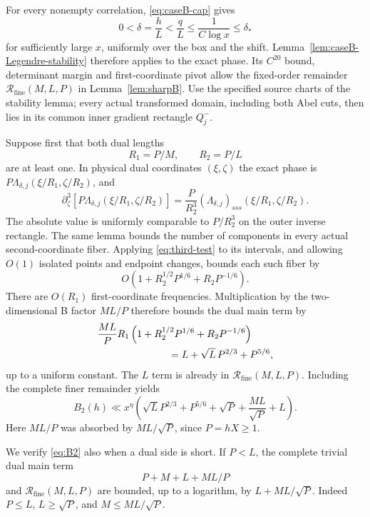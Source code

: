 \documentclass[11pt,a4paper]{article}
\numberwithin{equation}{section}
\theoremstyle{remark}
\newcommand{\Rfine}{\mathcal R_{\mathrm{fine}}}
\begin{document}
For every nonempty correlation, \eqref{eq:caseB-cap} gives
\[
 0<\delta=\frac hL<\frac qL\le\frac1{C\log x}\le\delta_*
\]
for sufficiently large $x$, uniformly over the box and the shift.
Lemma~\ref{lem:caseB-Legendre-stability} therefore applies to the exact
phase. Its $C^{20}$ bound, determinant margin and first-coordinate pivot
allow the fixed-order remainder $\Rfine(M,L,P)$ in
Lemma~\ref{lem:sharpB}. Use the specified source charts of the stability
lemma; every actual transformed domain, including both Abel cuts, then
lies in its common inner gradient rectangle $Q_j^-$.

Suppose first that both dual lengths
\[
 R_1=P/M,\qquad R_2=P/L
\]
are at least one. In physical dual coordinates $(\xi,\zeta)$ the exact
phase is $P\Lambda_{\delta,j}(\xi/R_1,\zeta/R_2)$, and
\begin{equation}\label{eq:caseB-physical-third}
 \partial_\zeta^3\left[P\Lambda_{\delta,j}
               (\xi/R_1,\zeta/R_2)\right]
 =\frac P{R_2^3}(\Lambda_{\delta,j})_{sss}
               (\xi/R_1,\zeta/R_2).
\end{equation}
The absolute value is uniformly comparable to $P/R_2^3$ on the outer
inverse rectangle. The same lemma bounds the number of components in
every actual second-coordinate fiber. Applying \eqref{eq:third-test}
to its intervals, and allowing $O(1)$ isolated points and endpoint
changes, bounds each such fiber by
\[
 O\left(1+R_2^{1/2}P^{1/6}+R_2P^{-1/6}\right).
\]
There are $O(R_1)$ first-coordinate frequencies. Multiplication by the
two-dimensional B factor $ML/P$ therefore bounds the dual main term by
\begin{align*}
 &\frac{ML}{P}R_1
       \left(1+R_2^{1/2}P^{1/6}+R_2P^{-1/6}\right)\\
 &\hspace{25mm}=L+\sqrt L\,P^{2/3}+P^{5/6},
\end{align*}
up to a uniform constant. The $L$ term is already in $\Rfine(M,L,P)$.
Including the complete finer remainder yields
\begin{equation}\label{eq:B2}
 B_2(h)\ll x^\eta\left(
       \sqrt L P^{2/3}+P^{5/6}+\sqrt P+\frac{ML}{\sqrt P}+L\right).
\end{equation}
Here $ML/P$ was absorbed by $ML/\sqrt P$, since $P=hX\ge1$.

We verify \eqref{eq:B2} also when a dual side is short. If $P<L$, the
complete trivial dual main term
\[
 P+M+L+ML/P
\]
and $\Rfine(M,L,P)$ are bounded, up to a logarithm, by
$L+ML/\sqrt P$. Indeed $P\le L$, $L\ge\sqrt P$, and
$M\le ML/\sqrt P$.
\end{document}
